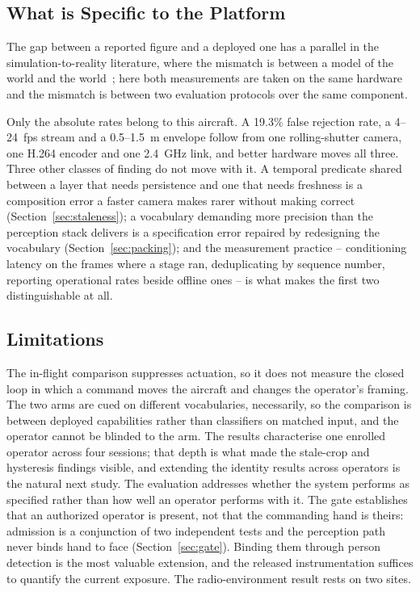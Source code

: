 \documentclass[conference]{IEEEtran}
\begin{document}
\subsection{What is Specific to the Platform}

The gap between a reported figure and a deployed one has a parallel in the
simulation-to-reality literature, where the mismatch is between a model of the
world and the world~\cite{aljalbout2025realitygap}; here both measurements are
taken on the same hardware and the mismatch is between two evaluation
protocols over the same component.

Only the absolute rates belong to this aircraft. A 19.3\% false rejection rate,
a 4--24~fps stream and a 0.5--1.5~m envelope follow from one rolling-shutter
camera, one H.264 encoder and one 2.4~GHz link, and better hardware moves all
three. Three other classes of finding do not move with it. A temporal predicate
shared between a layer that needs persistence and one that needs freshness is a
composition error a faster camera makes rarer without making correct
(Section~\ref{sec:staleness}); a vocabulary demanding more precision than the
perception stack delivers is a specification error repaired by redesigning the
vocabulary (Section~\ref{sec:packing}); and the measurement practice --
conditioning latency on the frames where a stage ran, deduplicating by sequence
number, reporting operational rates beside offline ones -- is what makes the
first two distinguishable at all.

\subsection{Limitations}
\label{sec:limitations}

The in-flight comparison suppresses actuation, so it does not measure the
closed loop in which a command moves the aircraft and changes the operator's
framing. The two arms are cued on different vocabularies, necessarily, so the
comparison is between deployed capabilities rather than classifiers on matched
input, and the operator cannot be blinded to the arm. The results characterise
one enrolled operator across four sessions; that depth is what made the
stale-crop and hysteresis findings visible, and extending the identity results
across operators is the natural next study. The evaluation addresses whether the
system performs as specified rather than how well an operator performs with it.
The gate establishes that an authorized operator is present, not that the
commanding hand is theirs: admission is a conjunction of two independent tests
and the perception path never binds hand to face
(Section~\ref{sec:gate}). Binding them through person detection is the most
valuable extension, and the released instrumentation suffices to quantify the
current exposure. The radio-environment result rests on two sites.
\end{document}
